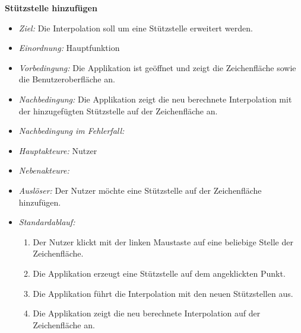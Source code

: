 \textbf{St\"utzstelle hinzuf\"ugen}
  \begin{itemize}
  	\item \textit{Ziel:} Die Interpolation soll um eine St\"utzstelle erweitert werden.
  	\item \textit{Einordnung:} Hauptfunktion
  	\item \textit{Vorbedingung:} Die Applikation ist ge\"offnet und zeigt die Zeichenfl\"ache sowie die Benutzeroberfl\"ache an.
  	\item \textit{Nachbedingung:} Die Applikation zeigt die neu berechnete Interpolation mit der hinzugef\"ugten St\"utzstelle auf der Zeichenfl\"ache an.
  \item \textit{Nachbedingung im Fehlerfall:} 
  \item \textit{Hauptakteure:} Nutzer
  \item \textit{Nebenakteure:} 
  \item \textit{Ausl\"oser:} Der Nutzer m\"ochte eine St\"utzstelle auf der Zeichenfl\"ache hinzuf\"ugen.
  \item \textit{Standardablauf:}
    \begin{enumerate}[label=(\arabic*)]
    \item Der Nutzer klickt mit der linken Maustaste auf eine beliebige Stelle der Zeichenfl\"ache.
    \item Die Applikation erzeugt eine St\"utzstelle auf dem angeklickten Punkt.
    \item Die Applikation f\"uhrt die Interpolation mit den neuen St\"utzstellen aus.
    \item Die Applikation zeigt die neu berechnete Interpolation auf der Zeichenfl\"ache an.
    \end{enumerate}
  \end{itemize}
